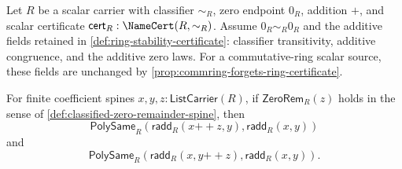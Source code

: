 \begin{lemma}
\label{lem:polynomial-raw-add-zero-tail-trim-stability}
Let $R$ be a scalar carrier with classifier $\sim_R$, zero endpoint $0_R$, addition $+$, and scalar certificate $\mathsf{cert}_R:\NameCert(R,\sim_R)$. Assume $0_R\sim_R0_R$ and the additive fields retained in \autoref{def:ring-stability-certificate}: classifier transitivity, additive congruence, and the additive zero laws. For a commutative-ring scalar source, these fields are unchanged by \autoref{prop:commring-forgets-ring-certificate}.

For finite coefficient spines $x,y,z:\mathsf{ListCarrier}(R)$, if $\mathsf{ZeroRem}_R(z)$ holds in the sense of \autoref{def:classified-zero-remainder-spine}, then
$$
\mathsf{PolySame}_R(\mathsf{radd}_R(x{++}z,y),\mathsf{radd}_R(x,y))
$$
and
$$
\mathsf{PolySame}_R(\mathsf{radd}_R(x,y{++}z),\mathsf{radd}_R(x,y)).
$$
\end{lemma}
